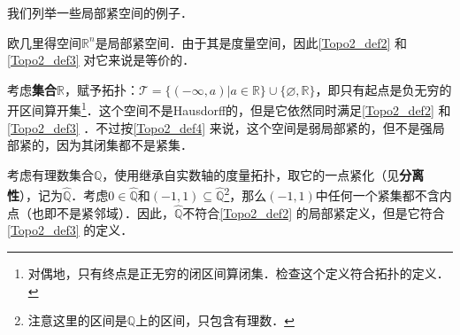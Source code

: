 我们列举一些局部紧空间的例子．

\begin{example}{}
欧几里得空间$\mathbb{R}^n$是局部紧空间．由于其是度量空间，因此\autoref{Topo2_def2} 和\autoref{Topo2_def3} 对它来说是等价的．
\end{example}

\begin{example}{}
考虑\textbf{集合}$\mathbb{R}$，赋予拓扑：$\mathcal{T}=\{(-\infty, a)|a\in\mathbb{R}\}\cup\{\varnothing, \mathbb{R}\}$，即只有起点是负无穷的开区间算开集\footnote{对偶地，只有终点是正无穷的闭区间算闭集．检查这个定义符合拓扑的定义．}．这个空间不是Hausdorff的，但是它依然同时满足\autoref{Topo2_def2} 和\autoref{Topo2_def3} ．不过按\autoref{Topo2_def4} 来说，这个空间是弱局部紧的，但不是强局部紧的，因为其闭集都不是紧集．
\end{example}

\begin{example}{}
考虑有理数集合$\mathbb{Q}$，使用继承自实数轴的度量拓扑，取它的一点紧化（见\textbf{分离性}），记为$\hat{\mathbb{Q}}$．考虑$0\in\hat{\mathbb{Q}}$和$(-1, 1)\subseteq\hat{\mathbb{Q}}$\footnote{注意这里的区间是$\mathbb{Q}$上的区间，只包含有理数．}，那么$(-1, 1)$中任何一个紧集都不含内点（也即不是紧邻域）．因此，$\hat{\mathbb{Q}}$不符合\autoref{Topo2_def2} 的局部紧定义，但是它符合\autoref{Topo2_def3} 的定义．
\end{example}












